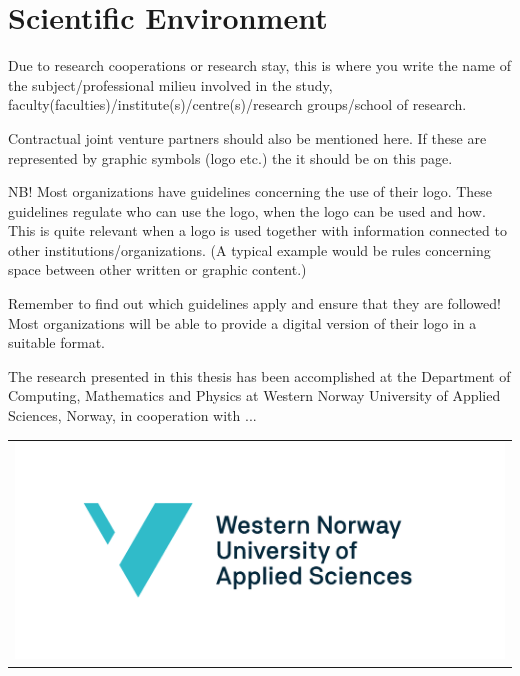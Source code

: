 \chapter{Scientific Environment}

Due to research cooperations or research stay, this is where you write the name of the subject/professional milieu involved in the study, faculty(faculties)/institute(s)/centre(s)/research groups/school of research.

Contractual joint venture partners should also be mentioned here. If these are represented by graphic symbols (logo etc.) the it should be on this page.

NB! Most organizations have guidelines concerning the use of their logo. These guidelines regulate who can use the logo, when the logo can be used and how. This is quite relevant when a logo is used together with information connected to other institutions/organizations. (A typical example would be rules concerning space between other written or graphic content.)

Remember to find out which guidelines apply and ensure that they are followed!
Most organizations will be able to provide a digital version of their logo in a suitable format.

\eg The research presented in this thesis has been accomplished
at the Department of Computing, Mathematics and Physics
at Western Norway University of Applied Sciences, Norway,
in cooperation with ...

\hspace{8em}
\begin{tabular}{l}
  \includegraphics[scale=0.36, center]{logos/hvl_logo.pdf}\\
\end{tabular}
